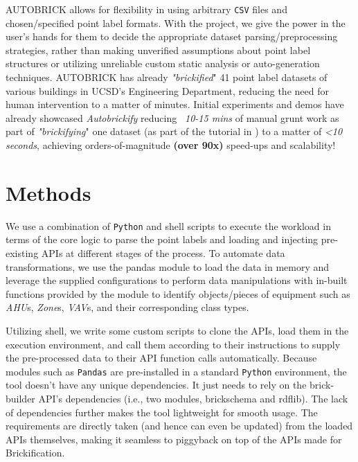 \documentclass[twocolumn, switch]{article} %
\begin{document}
	AUTOBRICK allows for flexibility in using arbitrary \texttt{CSV} files and
    chosen/specified point label formats. With the project, we give the power
    in the user’s hands for them to decide the appropriate dataset
    parsing/preprocessing strategies, rather than making unverified assumptions
    about point label structures or utilizing unreliable custom static analysis
    or auto-generation techniques. AUTOBRICK has already \emph{"brickified}" 41 point
    label datasets of various buildings in UCSD’s Engineering Department,
    reducing the need for human intervention to a matter of minutes. Initial
    experiments and demos have already showcased \emph{Autobrickify} reducing
    \emph{~10-15 mins} of manual grunt work as part of \emph{"brickifying}" one dataset (as part of
    the tutorial in \cite{gtfierro225_2020}) to a matter of \emph{<10 seconds}, 
    achieving orders-of-magnitude \textbf{(over 90x)} speed-ups and scalability!

\section{Methods}
We use a combination of \texttt{Python} and shell scripts to execute the workload in terms of the core logic to parse the point labels and loading and injecting pre-existing APIs at different stages of the process.  
To automate data transformations, we use the pandas module to load the data in
memory and leverage the supplied configurations to perform data manipulations
with in-built functions provided by the module to identify objects/pieces of
equipment such as \emph{AHU}s, \emph{Zone}s, \emph{VAV}s, and their corresponding class types. 

	Utilizing shell, we write some custom scripts to clone the APIs, load them in the execution environment, and call them according to their instructions to supply the pre-processed data to their API function calls automatically.  
    Because modules such as \texttt{Pandas} are pre-installed in a standard
    \texttt{Python} environment, the tool doesn’t have any unique dependencies. It just needs to rely on the brick-builder API’s dependencies (i.e., two modules, brickschema and rdflib). The lack of dependencies further makes the tool lightweight for smooth usage. The requirements are directly taken (and hence can even be updated) from the loaded APIs themselves, making it seamless to piggyback on top of the APIs made for Brickification.
\end{document}
